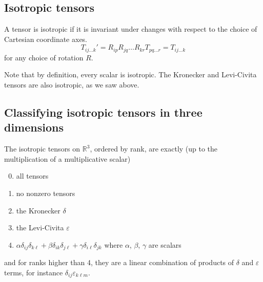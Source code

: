 \subsection{Isotropic tensors}
\begin{definition}
	A tensor is isotropic if it is invariant under changes with respect to the choice of Cartesian coordinate axes.
	\[
		T_{ij\dots k}' = R_{ip} R_{jq} \dots R_{kr} T_{pq\dots r} = T_{ij\dots k}
	\]
	for any choice of rotation \(R\).
\end{definition}
Note that by definition, every scalar is isotropic.
The Kronecker and Levi-Civita tensors are also isotropic, as we saw above.

\subsection{Classifying isotropic tensors in three dimensions}
\begin{proposition}
	The isotropic tensors on \(\mathbb R^3\), ordered by rank, are exactly (up to the multiplication of a multiplicative scalar)
	\begin{enumerate}[label={Rank \arabic*:}, align=left, leftmargin=*]
		\setcounter{enumi}{-1}
		\item all tensors
		\item no nonzero tensors
		\item the Kronecker \(\delta\)
		\item the Levi-Civita \(\varepsilon\)
		\item \(\alpha \delta_{ij} \delta_{k\ell} + \beta \delta_{ik} \delta_{j\ell} + \gamma \delta_{i\ell} \delta_{jk}\) where \(\alpha\), \(\beta\), \(\gamma\) are scalars
	\end{enumerate}
	and for ranks higher than 4, they are a linear combination of products of \(\delta\) and \(\varepsilon\) terms, for instance \(\delta_{ij}\varepsilon_{k\ell m}\).
\end{proposition}

